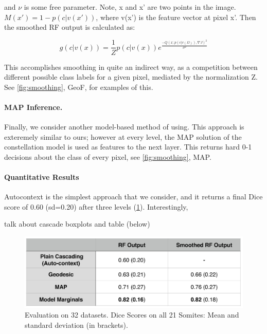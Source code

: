 \documentclass[10pt,twocolumn,letterpaper]{article}
\begin{document}
and $\nu$ is some free parameter.  Note, x and x' are two points in the image. $M(x') = 1 - p(c|v(x'))$, where v(x') is the feature vector at pixel x'.  Then the smoothed RF output is calculated as:

\[ g(c|v(x)) = \frac{1}{Z} p(c|v(x)) e^{\frac{-Q(x;p(c|v(\Omega)),\nabla J)^2}{\sigma ^2}} \]

This accomplishes smoothing in quite an indirect way, as a competition between different possible class labels for a given pixel, mediated by the normalization Z.  See \ref{fig:smoothing}, GeoF, for examples of this.

\paragraph{MAP Inference. }

Finally, we consider another model-based method of using.  This approach is exteremely similar to ours; however at every level, the MAP solution of the constellation model is used as features to the next layer.  This returns hard 0-1 decisions about the class of every pixel, see \ref{fig:smoothing}, MAP.

\paragraph{Quantitative Results}

Autocontext is the simplest approach that we consider, and it returns a final Dice score of 0.60 (sd=0.20) after three levels (\ref{tab:results}).  Interestingly, 


talk about cascade boxplots and table (below)

\begin{figure}[t]
\begin{center}
\includegraphics[width=\columnwidth]{TableDiceScores_2columns_noGeoF2.jpg} %
\caption{Evaluation on 32 datasets. Dice Scores on all 21 Somites: Mean and standard deviation (in brackets).}
\label{tab:results}
\end{center}
\end{figure}
\end{document}

